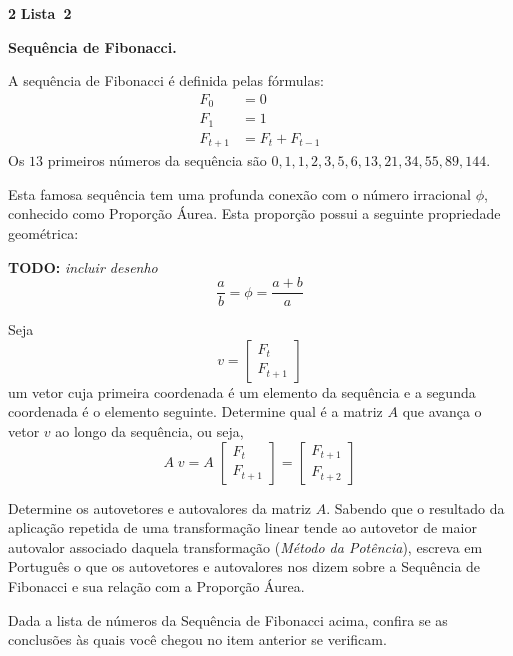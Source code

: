 \documentclass{article}
\newenvironment{question}
    {\medskip\bfseries\large}
    {\medskip}
\newcounter{exe-list}
\newenvironment{exe-list}
    {\begin{list}{(\alph{exe-list})}{\usecounter{exe-list}}}
    {\end{list}}
\newenvironment{exe}[2][Sala]
    {\bigskip\noindent\par\ifthenelse{\equal{#1}{}}%
        {\textbf{\LARGE #2}}%
        {\textbf{\LARGE #1~#2}}%
    \medskip\noindent\par}
    {\bigskip}
\newcommand{\todo}[1]{\textbf{TODO:} {\itshape #1}}
\begin{document}
\begin{exe}[Lista]{2}
    \begin{question}
        Sequência de Fibonacci. \medskip\noindent\par
        A sequência de Fibonacci
        é definida pelas fórmulas:
        \begin{align*}
            F_0 &= 0 \\
            F_1 &= 1 \\
            F_{t+1} &= F_t + F_{t-1}
        \end{align*}
        Os \(13\) primeiros números da sequência são
        \(0, 1, 1, 2, 3, 5, 6, 13, 21, 34, 55, 89, 144\).

        Esta famosa sequência tem uma profunda conexão
        com o número irracional \(\phi\),
        conhecido como Proporção Áurea.
        Esta proporção possui a seguinte propriedade geométrica:

        \todo{incluir desenho}
        \[
            \frac{a}{b} = \phi = \frac{a+b}{a}
        \]
        \begin{exe-list}
            \item
                Seja
                \[
                    v = \begin{bmatrix}
                        F_t \\ F_{t+1}
                    \end{bmatrix}
                \]
                um vetor cuja primeira coordenada é
                um elemento da sequência e
                a segunda coordenada é o elemento seguinte.
                Determine qual é a matriz \(A\) que
                avança o vetor \(v\) ao longo da sequência,
                ou seja,
                \[
                    A \; v
                    = A \; \begin{bmatrix}
                        F_t \\ F_{t+1}
                    \end{bmatrix}
                    = \begin{bmatrix}
                        F_{t+1} \\ F_{t+2}
                    \end{bmatrix}
                \]
            \item
                Determine os autovetores e autovalores
                da matriz \(A\).
                Sabendo que o resultado da aplicação repetida
                de uma transformação linear
                tende ao autovetor de maior autovalor associado
                daquela transformação
                (\emph{Método da Potência}),
                escreva em Português o que
                os autovetores e autovalores nos dizem
                sobre a Sequência de Fibonacci e
                sua relação com a Proporção Áurea.
            \item
                Dada a lista de números
                da Sequência de Fibonacci acima,
                confira se as conclusões às quais você chegou
                no item anterior se verificam.
        \end{exe-list}
    \end{question}


\end{exe}
\end{document}
